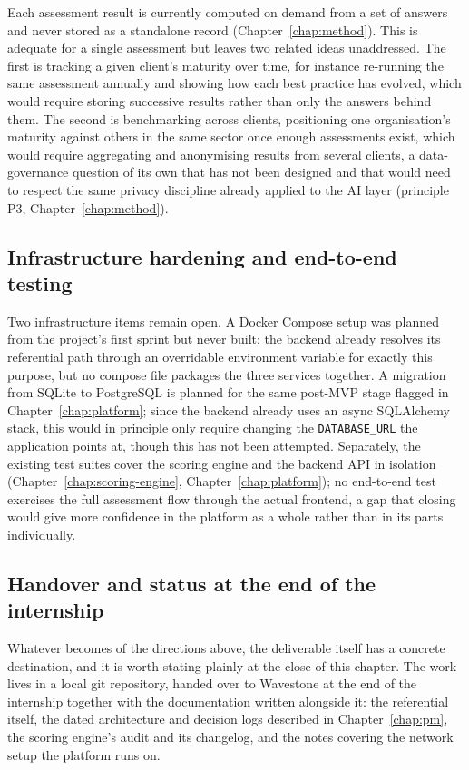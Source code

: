 Each assessment result is currently computed on demand from a set of answers and never stored as a standalone record (Chapter~\ref{chap:method}). This is adequate for a single assessment but leaves two related ideas unaddressed. The first is tracking a given client's maturity over time, for instance re-running the same assessment annually and showing how each best practice has evolved, which would require storing successive results rather than only the answers behind them. The second is benchmarking across clients, positioning one organisation's maturity against others in the same sector once enough assessments exist, which would require aggregating and anonymising results from several clients, a data-governance question of its own that has not been designed and that would need to respect the same privacy discipline already applied to the AI layer (principle P3, Chapter~\ref{chap:method}).

\subsection{Infrastructure hardening and end-to-end testing}
\label{sec:impact-perspectives-hardening-testing}

Two infrastructure items remain open. A Docker Compose setup was planned from the project's first sprint but never built; the backend already resolves its referential path through an overridable environment variable for exactly this purpose, but no compose file packages the three services together. A migration from SQLite to PostgreSQL is planned for the same post-MVP stage flagged in Chapter~\ref{chap:platform}; since the backend already uses an async SQLAlchemy stack, this would in principle only require changing the \texttt{DATABASE\_URL} the application points at, though this has not been attempted. Separately, the existing test suites cover the scoring engine and the backend API in isolation (Chapter~\ref{chap:scoring-engine}, Chapter~\ref{chap:platform}); no end-to-end test exercises the full assessment flow through the actual frontend, a gap that closing would give more confidence in the platform as a whole rather than in its parts individually.

\subsection{Handover and status at the end of the internship}
\label{sec:impact-perspectives-handover}

Whatever becomes of the directions above, the deliverable itself has a concrete destination, and it is worth stating plainly at the close of this chapter. The work lives in a local git repository, handed over to Wavestone at the end of the internship together with the documentation written alongside it: the referential itself, the dated architecture and decision logs described in Chapter~\ref{chap:pm}, the scoring engine's audit and its changelog, and the notes covering the network setup the platform runs on.

